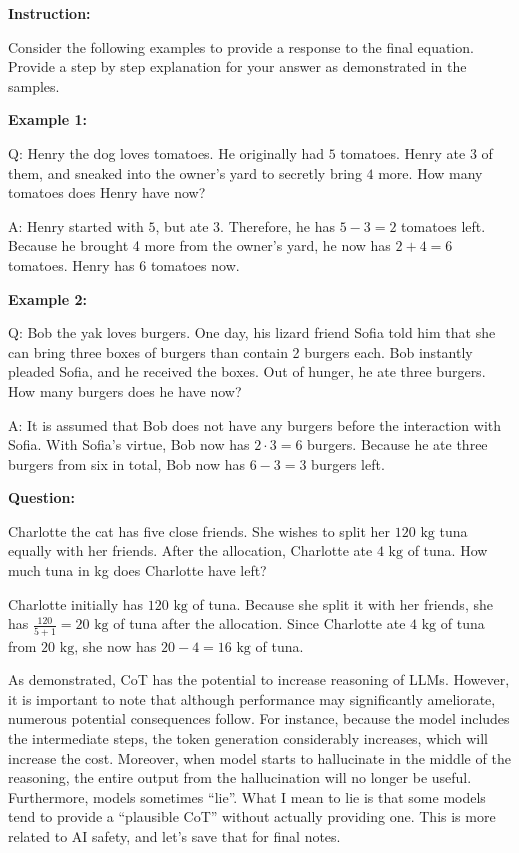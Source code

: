 \documentclass[../../main.tex]{subfiles}
\begin{document}
\begin{example}
\textbf{Instruction:}

Consider the following examples to provide a response to the
final equation. Provide a step by step explanation for your
answer as demonstrated in the samples.

\textbf{Example 1:}

Q: Henry the dog loves tomatoes. He originally had $5$ tomatoes.
Henry ate $3$ of them, and sneaked into the owner's yard to
secretly bring $4$ more. How many tomatoes does Henry have now?

A: Henry started with $5$, but ate $3$. Therefore, he has
$5 - 3 = 2$ tomatoes left. Because he brought 4 more from the
owner's yard, he now has $2 + 4 = 6$ tomatoes. Henry has $6$
tomatoes now.

\textbf{Example 2:}

Q: Bob the yak loves burgers. One day, his lizard friend Sofia
told him that she can bring three boxes of burgers than contain
2 burgers each. Bob instantly pleaded Sofia, and he received the
boxes. Out of hunger, he ate three burgers. How many burgers
does he have now?

A: It is assumed that Bob does not have any burgers before the
interaction with Sofia. With Sofia's virtue, Bob now has
$2 \cdot 3 = 6$ burgers. Because he ate three burgers from
six in total, Bob now has $6 - 3 = 3$ burgers left.

\textbf{Question:}

Charlotte the cat has five close friends. She wishes to split
her $120 \text{ kg}$ tuna equally with her friends. After the
allocation, Charlotte ate $4 \text{ kg}$ of tuna. How much
tuna in kg does Charlotte have left?
\end{example}

\begin{example}
Charlotte initially has $120 \text{ kg}$ of tuna. Because she
split it with her friends, she has $\frac{120}{5 + 1} = 20
\text{ kg}$ of tuna after the allocation. Since Charlotte ate
$4 \text{ kg}$ of tuna from $20 \text{ kg}$, she now has
$20 - 4 = 16 \text{ kg}$ of tuna.
\end{example}

As demonstrated, CoT has the potential to increase reasoning
of LLMs. However, it is important to note that although performance
may significantly ameliorate, numerous potential consequences
follow. For instance, because the model includes the intermediate
steps, the token generation considerably increases, which will
increase the cost. Moreover, when model starts to hallucinate
in the middle of the reasoning, the entire output from the
hallucination will no longer be useful. Furthermore, models
sometimes ``lie''. What I mean to lie is that some models tend
to provide a ``plausible CoT'' without actually providing one.
This is more related to AI safety, and let's save that for final
notes.
\end{document}
